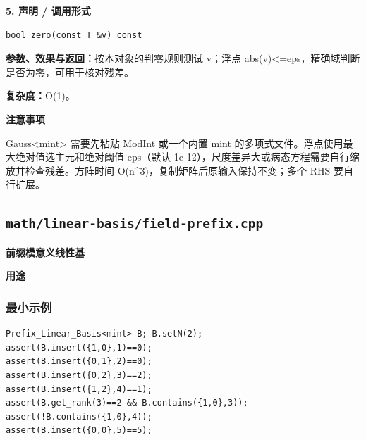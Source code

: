 \documentclass[UTF8,a4paper,10pt]{ctexart}
\newcommand{\TemplUsage}[1]{\textbf{用途}\par #1\par}
\newcommand{\TemplNote}[1]{\textbf{注意事项}\par #1\par}
\begin{document}
\noindent\begin{minipage}{\textwidth}
\textbf{5. 声明 / 调用形式}
\begin{lstlisting}
bool zero(const T &v) const
\end{lstlisting}
\textbf{参数、效果与返回：}按本对象的判零规则测试 v；浮点 abs(v)<=eps，精确域判断是否为零，可用于核对残差。

\textbf{复杂度：}O(1)。

\TemplNote{Gauss<mint> 需要先粘贴 ModInt 或一个内置 mint 的多项式文件。浮点使用最大绝对值选主元和绝对阈值 eps（默认 1e-12），尺度差异大或病态方程需要自行缩放并检查残差。方阵时间 O(n\textasciicircum{}3)，复制矩阵后原输入保持不变；多个 RHS 要自行扩展。}
\end{minipage}\par\vspace{0.4em}
\clearpage
\subsection{\texttt{math/linear-basis/field-prefix.cpp}}
\textbf{前缀模意义线性基}\par
\TemplUsage{}
\subsubsection*{最小示例}
\begin{lstlisting}
Prefix_Linear_Basis<mint> B; B.setN(2);
assert(B.insert({1,0},1)==0);
assert(B.insert({0,1},2)==0);
assert(B.insert({0,2},3)==2);
assert(B.insert({1,2},4)==1);
assert(B.get_rank(3)==2 && B.contains({1,0},3));
assert(!B.contains({1,0},4));
assert(B.insert({0,0},5)==5);
\end{lstlisting}
\end{document}
